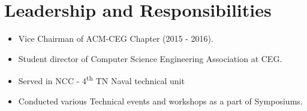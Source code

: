 \documentclass[a4paper,10pt]{article}
\begin{document}
\section{Leadership and Responsibilities}
\begin{itemize}
    \item   Vice Chairman of ACM-CEG Chapter (2015 - 2016).
    \item   Student director of Computer Science Engineering Association at CEG.
    \item   Served in NCC - 4\textsuperscript{th} TN Naval technical unit
    \item   Conducted various Technical events and workshops as a part of Symposiums.
\end{itemize}


\end{document}
